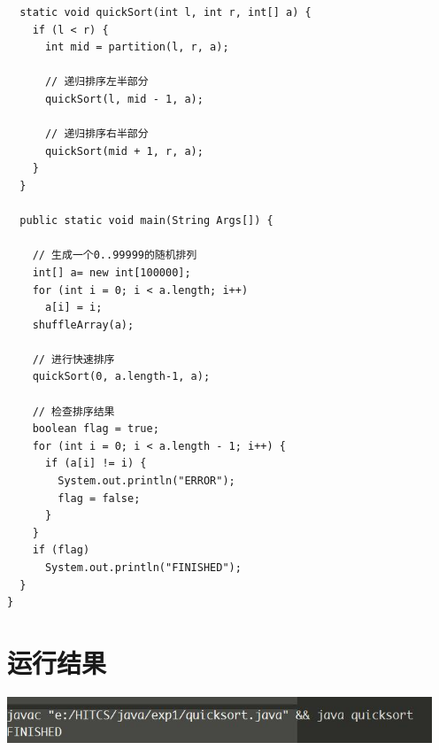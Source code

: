 \documentclass[11pt, a4paper]{article}
\begin{document}
\begin{CJK*}{UTF8}{gbsn}
\begin{lstlisting}
  static void quickSort(int l, int r, int[] a) {
    if (l < r) {
      int mid = partition(l, r, a);
      
      // 递归排序左半部分
      quickSort(l, mid - 1, a);
      
      // 递归排序右半部分
      quickSort(mid + 1, r, a);  
    }
  }
  
  public static void main(String Args[]) {
    
    // 生成一个0..99999的随机排列
    int[] a= new int[100000];
    for (int i = 0; i < a.length; i++)
      a[i] = i;
    shuffleArray(a);

    // 进行快速排序
    quickSort(0, a.length-1, a);

    // 检查排序结果
    boolean flag = true;
    for (int i = 0; i < a.length - 1; i++) {
      if (a[i] != i) {
        System.out.println("ERROR");
        flag = false;
      }
    }
    if (flag)
      System.out.println("FINISHED");
  }
}

  \end{lstlisting}

  \section{运行结果}

  \begin{center}
    \includegraphics[width=5in]{result.jpg}
  \end{center}

  \newpage  
\end{CJK*}
\end{document}
